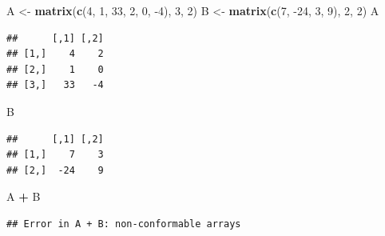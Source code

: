 \documentclass[
]{book}
\newenvironment{Shaded}{\begin{snugshade}}{\end{snugshade}}
\newcommand{\DecValTok}[1]{\textcolor[rgb]{0.00,0.00,0.81}{#1}}
\newcommand{\KeywordTok}[1]{\textcolor[rgb]{0.13,0.29,0.53}{\textbf{#1}}}
\newcommand{\NormalTok}[1]{#1}
\newcommand{\OperatorTok}[1]{\textcolor[rgb]{0.81,0.36,0.00}{\textbf{#1}}}
\newcommand{\StringTok}[1]{\textcolor[rgb]{0.31,0.60,0.02}{#1}}
\theoremstyle{definition}
\theoremstyle{definition}
\theoremstyle{definition}
\theoremstyle{remark}
\begin{document}
\begin{Shaded}
\begin{Highlighting}[]
\NormalTok{A <-}\StringTok{ }\KeywordTok{matrix}\NormalTok{(}\KeywordTok{c}\NormalTok{(}\DecValTok{4}\NormalTok{, }\DecValTok{1}\NormalTok{, }\DecValTok{33}\NormalTok{, }\DecValTok{2}\NormalTok{, }\DecValTok{0}\NormalTok{, }\DecValTok{-4}\NormalTok{), }\DecValTok{3}\NormalTok{, }\DecValTok{2}\NormalTok{)}
\NormalTok{B <-}\StringTok{ }\KeywordTok{matrix}\NormalTok{(}\KeywordTok{c}\NormalTok{(}\DecValTok{7}\NormalTok{, }\DecValTok{-24}\NormalTok{, }\DecValTok{3}\NormalTok{, }\DecValTok{9}\NormalTok{), }\DecValTok{2}\NormalTok{, }\DecValTok{2}\NormalTok{)}
\NormalTok{A}
\end{Highlighting}
\end{Shaded}

\begin{verbatim}
##      [,1] [,2]
## [1,]    4    2
## [2,]    1    0
## [3,]   33   -4
\end{verbatim}

\begin{Shaded}
\begin{Highlighting}[]
\NormalTok{B}
\end{Highlighting}
\end{Shaded}

\begin{verbatim}
##      [,1] [,2]
## [1,]    7    3
## [2,]  -24    9
\end{verbatim}

\begin{Shaded}
\begin{Highlighting}[]
\NormalTok{A }\OperatorTok{+}\StringTok{ }\NormalTok{B}
\end{Highlighting}
\end{Shaded}

\begin{verbatim}
## Error in A + B: non-conformable arrays
\end{verbatim}
\end{document}
